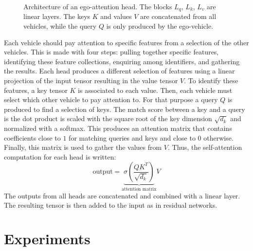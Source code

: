 \documentclass{article}
\begin{document}
\begin{figure}[ht]
	\caption{Architecture of an ego-attention head.
		The blocks $L_{q}$, $L_{k}$, $L_{v}$ are linear layers. The keys $K$ and values $V$ are concatenated from all vehicles, while the query $Q$ is only produced by the ego-vehicle.}
	\label{fig:ego-attention}
\end{figure}

Each vehicle should pay attention to specific features from a selection of the other vehicles.
This is made with four steps: pulling together specific features, identifying these feature collections,
enquiring among identifiers, and gathering the results.
Each head produces a different selection of features using a linear projection of
the input tensor resulting in the value tensor $V$.
To identify these features, a key tensor $K$ is associated to each value.
Then, each vehicle must select which other vehicle to pay attention to.
For that purpose a query $Q$ is produced to find a selection of keys.
The match score between a key and a query is the dot product is scaled with the square root of the key
dimension $\sqrt{d_k}$ and normalized with a softmax.
This produces an attention matrix that contains coefficients close to $1$ for matching queries and keys
and close to $0$ otherwise.
Finally, this matrix is used to gather the values from $V$.
Thus, the self-attention computation for each head is written:
\begin{equation}
\text{output}=\underbrace{\sigma\left(\frac{QK^T}{\sqrt{d_k}}\right)}_{\text{attention matrix}}V
\label{eq_selfattention}
\end{equation}
The outputs from all heads are concatenated and combined with a linear layer.
The resulting tensor is then added to the input as in residual networks.


\section{Experiments}
\end{document}
